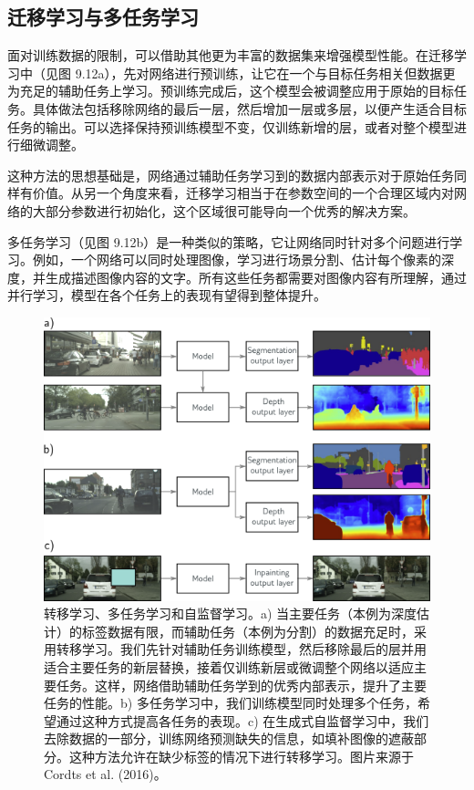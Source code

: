 \subsection{迁移学习与多任务学习}
面对训练数据的限制，可以借助其他更为丰富的数据集来增强模型性能。在迁移学习中（见图 9.12a），先对网络进行预训练，让它在一个与目标任务相关但数据更为充足的辅助任务上学习。预训练完成后，这个模型会被调整应用于原始的目标任务。具体做法包括移除网络的最后一层，然后增加一层或多层，以便产生适合目标任务的输出。可以选择保持预训练模型不变，仅训练新增的层，或者对整个模型进行细微调整。

这种方法的思想基础是，网络通过辅助任务学习到的数据内部表示对于原始任务同样有价值。从另一个角度来看，迁移学习相当于在参数空间的一个合理区域内对网络的大部分参数进行初始化，这个区域很可能导向一个优秀的解决方案。

多任务学习（见图 9.12b）是一种类似的策略，它让网络同时针对多个问题进行学习。例如，一个网络可以同时处理图像，学习进行场景分割、估计每个像素的深度，并生成描述图像内容的文字。所有这些任务都需要对图像内容有所理解，通过并行学习，模型在各个任务上的表现有望得到整体提升。

\begin{figure}[ht!]
	\centering
	\includegraphics[width=0.7\linewidth]{png/chapter9/RegTransferMulti.png}
	\caption{转移学习、多任务学习和自监督学习。a) 当主要任务（本例为深度估计）的标签数据有限，而辅助任务（本例为分割）的数据充足时，采用转移学习。我们先针对辅助任务训练模型，然后移除最后的层并用适合主要任务的新层替换，接着仅训练新层或微调整个网络以适应主要任务。这样，网络借助辅助任务学到的优秀内部表示，提升了主要任务的性能。b) 多任务学习中，我们训练模型同时处理多个任务，希望通过这种方式提高各任务的表现。c) 在生成式自监督学习中，我们去除数据的一部分，训练网络预测缺失的信息，如填补图像的遮蔽部分。这种方法允许在缺少标签的情况下进行转移学习。图片来源于 Cordts et al. (2016)。}
\end{figure}

